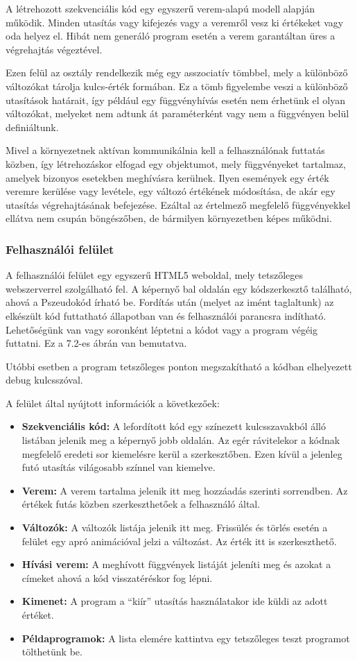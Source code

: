 A létrehozott szekvenciális kód egy egyszerű verem-alapú modell alapján működik. Minden utasítás vagy kifejezés vagy a veremről vesz ki értékeket vagy oda helyez el. Hibát nem generáló program esetén a verem garantáltan üres a végrehajtás végeztével.

Ezen felül az osztály rendelkezik még egy asszociatív tömbbel, mely a különböző változókat tárolja kulcs-érték formában. Ez a tömb figyelembe veszi a különböző utasítások határait, így például egy függvényhívás esetén nem érhetünk el olyan változókat, melyeket nem adtunk át paraméterként vagy nem a függvényen belül definiáltunk.

Mivel a környezetnek aktívan kommunikálnia kell a felhasználónak futtatás közben, így létrehozáskor elfogad egy objektumot, mely függvényeket tartalmaz, amelyek bizonyos esetekben meghívásra kerülnek. Ilyen események egy érték veremre kerülése vagy levétele, egy változó értékének módosítása, de akár egy utasítás végrehajtásának befejezése. Ezáltal az értelmező megfelelő függvényekkel ellátva nem csupán böngészőben, de bármilyen környezetben képes működni.

\subsubsection{Felhasználói felület}

A felhasználói felület egy egyszerű HTML5 weboldal, mely tetszőleges webszerverrel szolgálható fel. A képernyő bal oldalán egy kódszerkesztő található, ahová a Pszeudokód írható be. Fordítás után (melyet az imént taglaltunk) az elkészült kód futtatható állapotban van és felhasználói parancsra indítható. Lehetőségünk van vagy soronként léptetni a kódot vagy a program végéig futtatni. Ez a 7.2-es ábrán van bemutatva.

Utóbbi esetben a program tetszőleges ponton megszakítható a kódban elhelyezett debug kulcsszóval.

A felület által nyújtott információk a következőek:

\begin{itemize}
    \item \textbf{Szekvenciális kód:} A lefordított kód egy színezett kulcsszavakból álló listában jelenik meg a képernyő jobb oldalán. Az egér rávitelekor a kódnak megfelelő eredeti sor kiemelésre kerül a szerkesztőben. Ezen kívül a jelenleg futó utasítás világosabb színnel van kiemelve.
    \item \textbf{Verem:} A verem tartalma jelenik itt meg hozzáadás szerinti sorrendben. Az értékek futás közben szerkeszthetőek a felhasználó által.
    \item \textbf{Változók:} A változók listája jelenik itt meg. Frissülés és törlés esetén a felület egy apró animációval jelzi a változást. Az érték itt is szerkeszthető.
    \item \textbf{Hívási verem:} A meghívott függvények listáját jeleníti meg és azokat a címeket ahová a kód visszatéréskor fog lépni.
    \item \textbf{Kimenet:} A program a “kiír” utasítás használatakor ide küldi az adott értéket.
    \item \textbf{Példaprogramok:} A lista elemére kattintva egy tetszőleges teszt programot tölthetünk be.
\end{itemize}